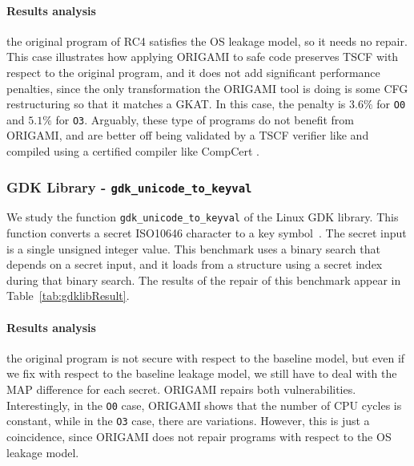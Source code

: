 {\paragraph*{Results analysis} the original program of RC4 satisfies the OS leakage model, so it needs no repair. This case illustrates how applying ORIGAMI to safe code preserves TSCF with respect to the original program, and it does not add significant performance penalties, since the only transformation the ORIGAMI tool is doing is some CFG restructuring so that it matches a GKAT. In this case, the penalty is $3.6\%$ for \texttt{O0} and $5.1\%$ for \texttt{O3}. Arguably, these type of programs do not benefit from ORIGAMI, and are better off being validated by a TSCF verifier like \cite{usenix_ctp_verification} and compiled using a certified compiler like CompCert \cite{CompCert}.

\subsubsection{GDK Library - \texttt{gdk\_unicode\_to\_keyval}}
We study the function \texttt{gdk\_unicode\_to\_keyval} of the Linux GDK library. This function converts a secret ISO10646 character to a key symbol~\cite{gdklib}. The secret input %
is a single unsigned integer value. This benchmark uses a binary search that depends on a secret input, and it loads from a structure using a secret index during that binary search.
  The results of the repair of this benchmark appear in Table~\ref{tab:gdklibResult}.

\paragraph*{Results analysis} the original program is not secure with respect to the baseline model, but even if we fix with respect to the baseline leakage model, we still have to deal with the MAP difference for each secret. ORIGAMI repairs both vulnerabilities. Interestingly, in the \texttt{O0} case, ORIGAMI shows that the number of CPU cycles is constant, while in the \texttt{O3} case, there are variations. However, this is just a coincidence, since ORIGAMI does not repair programs with respect to the OS leakage model. %

}
